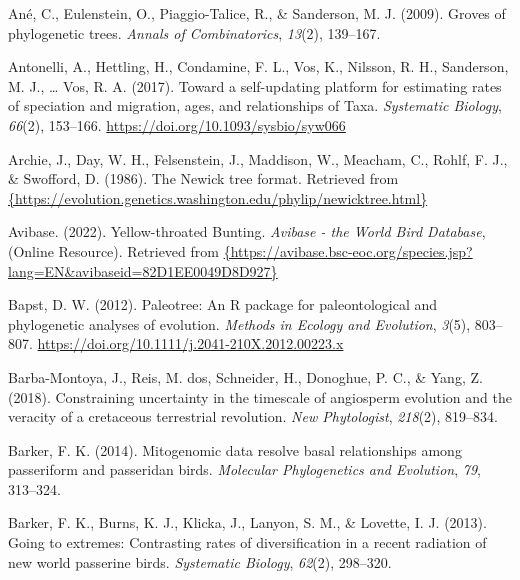\documentclass[english,man]{apa6}
\begin{document}
\leavevmode\hypertarget{ref-ane2009groves}{}%
Ané, C., Eulenstein, O., Piaggio-Talice, R., \& Sanderson, M. J. (2009). Groves of phylogenetic trees. \emph{Annals of Combinatorics}, \emph{13}(2), 139--167.

\leavevmode\hypertarget{ref-antonelli2017supersmart}{}%
Antonelli, A., Hettling, H., Condamine, F. L., Vos, K., Nilsson, R. H., Sanderson, M. J., \ldots{} Vos, R. A. (2017). Toward a self-updating platform for estimating rates of speciation and migration, ages, and relationships of Taxa. \emph{Systematic Biology}, \emph{66}(2), 153--166. \url{https://doi.org/10.1093/sysbio/syw066}

\leavevmode\hypertarget{ref-archie1986newick}{}%
Archie, J., Day, W. H., Felsenstein, J., Maddison, W., Meacham, C., Rohlf, F. J., \& Swofford, D. (1986). The Newick tree format. Retrieved from \href{\%7Bhttps://evolution.genetics.washington.edu/phylip/newicktree.html\%7D}{\{https://evolution.genetics.washington.edu/phylip/newicktree.html\}}

\leavevmode\hypertarget{ref-avibase-emberiza}{}%
Avibase. (2022). Yellow-throated Bunting. \emph{Avibase - the World Bird Database}, (Online Resource). Retrieved from \href{\%7Bhttps://avibase.bsc-eoc.org/species.jsp?lang=EN\&avibaseid=82D1EE0049D8D927\%7D}{\{https://avibase.bsc-eoc.org/species.jsp?lang=EN\&avibaseid=82D1EE0049D8D927\}}

\leavevmode\hypertarget{ref-Bapst2012a}{}%
Bapst, D. W. (2012). Paleotree: An R package for paleontological and phylogenetic analyses of evolution. \emph{Methods in Ecology and Evolution}, \emph{3}(5), 803--807. \url{https://doi.org/10.1111/j.2041-210X.2012.00223.x}

\leavevmode\hypertarget{ref-barba2018constraining}{}%
Barba-Montoya, J., Reis, M. dos, Schneider, H., Donoghue, P. C., \& Yang, Z. (2018). Constraining uncertainty in the timescale of angiosperm evolution and the veracity of a cretaceous terrestrial revolution. \emph{New Phytologist}, \emph{218}(2), 819--834.

\leavevmode\hypertarget{ref-barker2014mitogenomic}{}%
Barker, F. K. (2014). Mitogenomic data resolve basal relationships among passeriform and passeridan birds. \emph{Molecular Phylogenetics and Evolution}, \emph{79}, 313--324.

\leavevmode\hypertarget{ref-barker2013going}{}%
Barker, F. K., Burns, K. J., Klicka, J., Lanyon, S. M., \& Lovette, I. J. (2013). Going to extremes: Contrasting rates of diversification in a recent radiation of new world passerine birds. \emph{Systematic Biology}, \emph{62}(2), 298--320.
\end{document}
